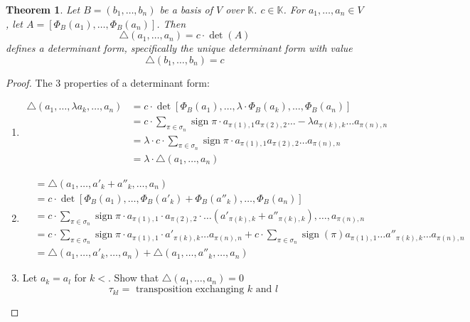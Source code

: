 \documentclass[a4paper,landscape,twocolumn]{article}
\newtheorem{theorem}{Theorem}
\DeclareMathOperator\sign{sign}
\begin{document}
\begin{theorem}
  \label{satz-7.22}
  Let $B = (b_1, \ldots, b_n)$ be a basis of $V$ over $\mathbb K$. $c \in \mathbb K$.
  For $a_1, \ldots, a_n \in V$, let $A = \left[\Phi_B(a_1), \ldots, \Phi_B(a_n)\right]$.
  Then
  \[ \triangle(a_1, \ldots, a_n) = c \cdot \det(A) \]
  defines a determinant form, specifically the unique determinant form with value
  \[ \triangle(b_1, \ldots, b_n) = c \]
\end{theorem}
\begin{proof}
  The 3 properties of a determinant form:
  \begin{enumerate}
    \item
      \begin{align*}
        \triangle(a_1, \ldots, \lambda a_k, \ldots, a_n)
        &= c \cdot \det\left[\Phi_B(a_1), \ldots, \lambda \cdot \Phi_B(a_k), \ldots, \Phi_B(a_n)\right] \\
        &= c \cdot \sum_{\pi \in \sigma_n} \sign{\pi} \cdot a_{\pi(1),1} a_{\pi(2),2} \ldots - \lambda a_{\pi(k),k} \ldots a_{\pi(n),n} \\
        &= \lambda \cdot c \cdot \sum_{\pi \in \sigma_n} \sign{\pi} \cdot a_{\pi(1),1} a_{\pi(2),2} \ldots a_{\pi(n),n} \\
        &= \lambda \cdot \triangle(a_1, \ldots, a_n)
      \end{align*}
    \item
      \begin{align*}
        &= \triangle(a_1, \ldots, a'_k + a''_k, \ldots, a_n) \\
          &= c \cdot \det\left[\Phi_B(a_1), \ldots, \Phi_B(a'_k) + \Phi_B(a''_k), \ldots, \Phi_B(a_n)\right] \\
          &= c \cdot \sum_{\pi \in \sigma_n} \sign{\pi} \cdot a_{\pi(1),1} \cdot a_{\pi(2),2} \cdot \ldots
             \left(a'_{\pi(k),k} + a''_{\pi(k),k}\right), \ldots, a_{\pi(n),n} \\
          &= c \cdot \sum_{\pi \in \sigma_n} \sign{\pi} \cdot a_{\pi(1),1} \cdot a'_{\pi(k),k} \ldots a_{\pi(n),n}
            + c \cdot \sum_{\pi \in \sigma_n} \sign(\pi) a_{\pi(1),1} \ldots a''_{\pi(k),k} \ldots a_{\pi(n),n} \\
          &= \triangle(a_1, \ldots, a'_k, \ldots, a_n) + \triangle(a_1, \ldots, a''_k, \ldots, a_n)
      \end{align*}
    \item
      Let $a_k = a_l$ for $k < $. Show that $\triangle(a_1, \ldots, a_n) = 0$
      \[ \tau_{kl} = \text{ transposition exchanging $k$ and $l$} \]

\end{enumerate}
\end{proof}
\end{document}
